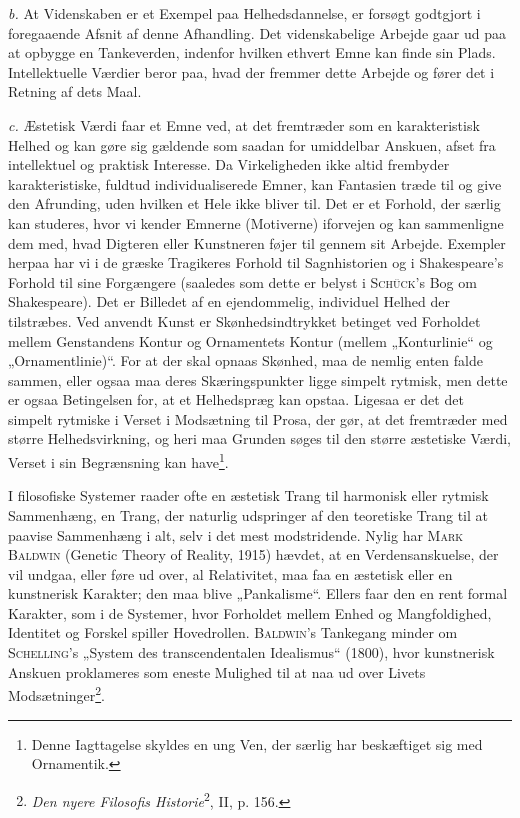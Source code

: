 \documentclass[12pt]{article}
\newcommand{\opage}[1]{\marginnote{\footnotesize\textit{[#1]}}}
\begin{document}
\textit{b.} At Videnskaben er et Exempel paa Helhedsdannelse, er forsøgt
godtgjort i foregaaende Afsnit af denne Afhandling. Det videnskabelige Arbejde
gaar ud paa
\setcounter{footnote}{0}%
\opage{69}at opbygge en Tankeverden, indenfor hvilken ethvert Emne kan finde sin
Plads. Intellektuelle Værdier beror paa, hvad der fremmer dette Arbejde og fører
det i Retning af dets Maal.

\textit{c.} Æstetisk Værdi faar et Emne ved, at det fremtræder som en
karakteristisk Helhed og kan gøre sig gældende som saadan for umiddelbar
Anskuen, afset fra intellektuel og praktisk Interesse. Da Virkeligheden ikke
altid frembyder karakteristiske, fuldtud individualiserede Emner, kan Fantasien
træde til og give den Afrunding, uden hvilken et Hele ikke bliver til. Det er et
Forhold, der særlig kan studeres, hvor vi kender Emnerne (Motiverne) iforvejen
og kan sammenligne dem med, hvad Digteren eller Kunstneren føjer til gennem sit
Arbejde. Exempler herpaa har vi i de græske Tragikeres Forhold til Sagnhistorien
og i Shakespeare's Forhold til sine Forgængere (saaledes som dette er belyst i
\textsc{Schück}'s Bog om Shakespeare). Det er Billedet af en ejendommelig,
individuel Helhed der tilstræbes. Ved anvendt Kunst er Skønhedsindtrykket
betinget ved Forholdet mellem Genstandens Kontur og Ornamentets Kontur (mellem
„Konturlinie“ og „Ornamentlinie)“.
For at der skal opnaas Skønhed, maa de nemlig enten falde sammen, eller ogsaa
maa deres Skæringspunkter ligge simpelt rytmisk, men dette er ogsaa Betingelsen
for, at et Helhedspræg kan opstaa. Ligesaa er det det simpelt rytmiske i Verset
i Modsætning til Prosa, der gør, at det fremtræder med større Helhedsvirkning,
og heri maa Grunden søges til den større æstetiske Værdi, Verset i sin
Begrænsning kan have\footnote{Denne Iagttagelse skyldes en ung Ven, der særlig
har beskæftiget sig med Ornamentik.}.

I filosofiske Systemer raader ofte en æstetisk Trang til harmonisk eller rytmisk
Sammenhæng, en Trang, der naturlig udspringer af den teoretiske Trang til at
paavise Sammenhæng i alt, selv i det mest modstridende. Nylig har \textsc{Mark
Baldwin} (Genetic Theory of Reality, 1915) hævdet, at en Verdensanskuelse, der
vil undgaa, eller føre ud over, al Relativitet, maa faa en æstetisk eller en
kunstnerisk Karakter; den maa blive „Pankalisme“. Ellers faar den en rent formal
Karakter, som i de Systemer, hvor Forholdet mellem Enhed og Mangfoldighed,
Identitet og Forskel spiller Hovedrollen. \textsc{Baldwin}'s Tankegang minder om
\textsc{Schelling}'s „System des transcendentalen Idealismus“ (1800), hvor
kunstnerisk Anskuen proklameres som eneste Mulighed til at naa ud over Livets
Modsætninger\footnote{\textit{Den nyere Filosofis Historie}\textsuperscript{2},
II, p. 156.}.
\end{document}
